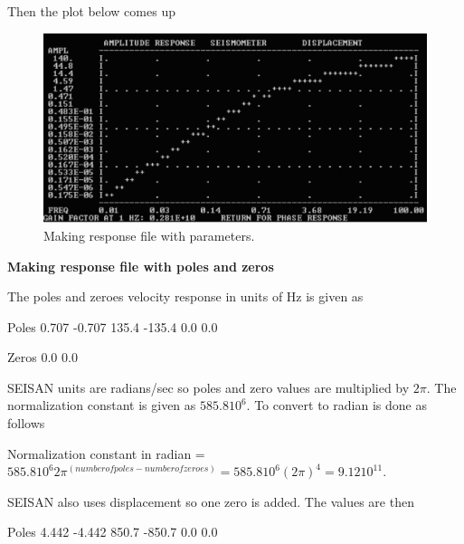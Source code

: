Then the plot below comes up 

\begin{figure}
\centerline{\includegraphics[width=0.9\linewidth]{fig/fig49}}
\caption{Making response file with parameters.}
\end{figure}

\textbf{Making response file with poles and zeros}

The poles and zeroes velocity response in units of Hz is given as 

Poles  0.707  -0.707  135.4  -135.4  0.0  0.0 

Zeros  0.0  0.0 

SEISAN units are radians/sec so poles and zero values  are multiplied by $2\pi$. \newline
The normalization constant is given as $585.8 10^{6}$. To convert to radian is done as follows 

Normalization constant in radian = $585.8 10^{6} 2\pi^{(number of poles-number of zeroes)} 
= 585.8 10^{6} (2\pi)^{4} = 9.12 10^{11}$. 

SEISAN also uses displacement so one zero is added. The values are then 

Poles 4.442  -4.442  850.7  -850.7  0.0  0.0 

